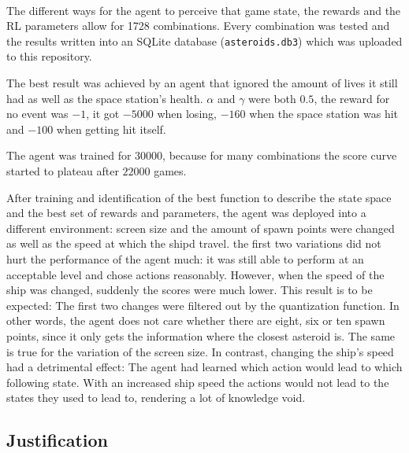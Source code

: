 \documentclass[a4paper,10pt]{article}
\begin{document}
\paragraph{}
The different ways for the agent to perceive that game state, the rewards and the RL parameters allow for 1728 combinations.
Every combination was tested and the results written into an SQLite database (\texttt{asteroids.db3}) which was uploaded to this repository.

The best result was achieved by an agent that ignored the amount of lives it still had as well as the space station's health.
$\alpha$ and $\gamma$ were both $0.5$, the reward for no event was $-1$, it got $-5000$ when losing, $-160$ when the space station was hit and $-100$ when getting hit itself.

The agent was trained for $30000$, because for many combinations the score curve started to plateau after $22000$ games.

After training and identification of the best function to describe the state space and the best set of rewards and parameters, the agent was deployed into a different environment:
screen size and the amount of spawn points were changed as well as the speed at which the shipd travel.
the first two variations did not hurt the performance of the agent much: it was still able to perform at an acceptable level and chose actions reasonably.
However, when the speed of the ship was changed, suddenly the scores were much lower.
This result is to be expected: The first two changes were filtered out by the quantization function.
In other words, the agent does not care whether there are eight, six or ten spawn points, since it only gets the information where the closest asteroid is.
The same is true for the variation of the screen size.
In contrast, changing the ship's speed had a detrimental effect: 
The agent had learned which action would lead to which following state.
With an increased ship speed the actions would not lead to the states they used to lead to, rendering a lot of knowledge void.

\subsection{Justification}
\end{document}
